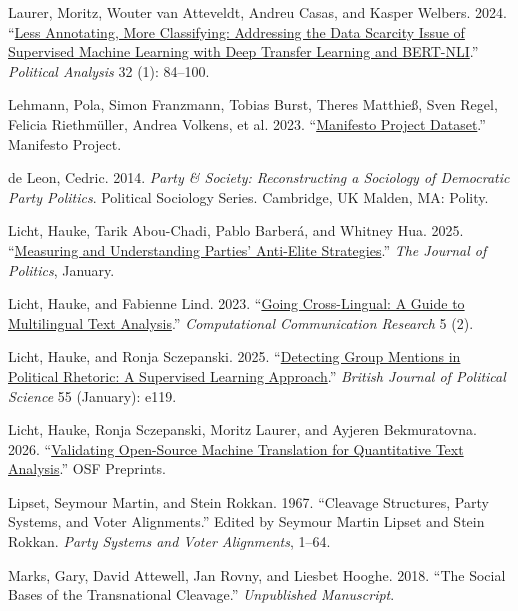 \documentclass[12pt]{article}
\begin{document}
\begin{CSLReferences}{1}{0}
Laurer, Moritz, Wouter van Atteveldt, Andreu Casas, and Kasper Welbers. 2024. {``\href{https://doi.org/10.1017/pan.2023.20}{Less Annotating, More Classifying: Addressing the Data Scarcity Issue of Supervised Machine Learning with Deep Transfer Learning and {BERT}-{NLI}}.''} \emph{Political Analysis} 32 (1): 84--100.

Lehmann, Pola, Simon Franzmann, Tobias Burst, Theres Matthieß, Sven Regel, Felicia Riethmüller, Andrea Volkens, et al. 2023. {``\href{https://doi.org/10.25522/MANIFESTO.MPDS.2023A}{Manifesto Project Dataset}.''} Manifesto Project.

de Leon, Cedric. 2014. \emph{Party \& Society: Reconstructing a Sociology of Democratic Party Politics}. Political Sociology Series. Cambridge, {UK} Malden, {MA}: Polity.

Licht, Hauke, Tarik Abou-Chadi, Pablo Barberá, and Whitney Hua. 2025. {``\href{https://doi.org/10.1086/730711}{Measuring and Understanding Parties' Anti-Elite Strategies}.''} \emph{The Journal of Politics}, January.

Licht, Hauke, and Fabienne Lind. 2023. {``\href{https://doi.org/10.5117/CCR2023.2.2.LICH}{Going Cross-Lingual: A Guide to Multilingual Text Analysis}.''} \emph{Computational Communication Research} 5 (2).

Licht, Hauke, and Ronja Sczepanski. 2025. {``\href{https://doi.org/10.1017/S0007123424000954}{Detecting Group Mentions in Political Rhetoric: A Supervised Learning Approach}.''} \emph{British Journal of Political Science} 55 (January): e119.

Licht, Hauke, Ronja Sczepanski, Moritz Laurer, and Ayjeren Bekmuratovna. 2026. {``\href{https://doi.org/10.31219/osf.io/9trjs}{Validating Open-Source Machine Translation for Quantitative Text Analysis}.''} {OSF} Preprints.

Lipset, Seymour Martin, and Stein Rokkan. 1967. {``Cleavage Structures, Party Systems, and Voter Alignments.''} Edited by Seymour Martin Lipset and Stein Rokkan. \emph{Party Systems and Voter Alignments}, 1--64.

Marks, Gary, David Attewell, Jan Rovny, and Liesbet Hooghe. 2018. {``The Social Bases of the Transnational Cleavage.''} \emph{Unpublished Manuscript}.


\end{CSLReferences}
\end{document}
